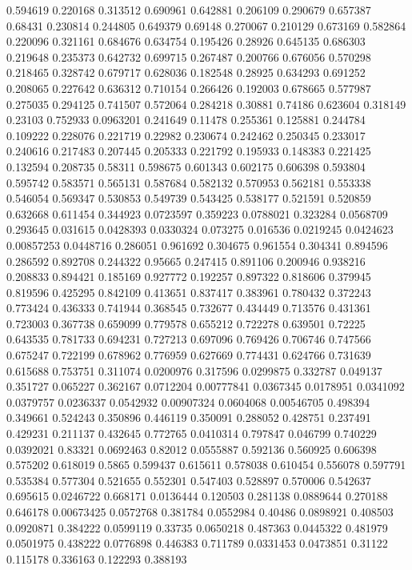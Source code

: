 0.594619 0.220168
0.313512 0.690961
0.642881 0.206109
0.290679 0.657387
0.68431 0.230814
0.244805 0.649379
0.69148 0.270067
0.210129 0.673169
0.582864 0.220096
0.321161 0.684676
0.634754 0.195426
0.28926 0.645135
0.686303 0.219648
0.235373 0.642732
0.699715 0.267487
0.200766 0.676056
0.570298 0.218465
0.328742 0.679717
0.628036 0.182548
0.28925 0.634293
0.691252 0.208065
0.227642 0.636312
0.710154 0.266426
0.192003 0.678665
0.577987 0.275035
0.294125 0.741507
0.572064 0.284218
0.30881 0.74186
0.623604 0.318149
0.23103 0.752933
0.0963201 0.241649
0.11478 0.255361
0.125881 0.244784
0.109222 0.228076
0.221719 0.22982
0.230674 0.242462
0.250345 0.233017
0.240616 0.217483
0.207445 0.205333
0.221792 0.195933
0.148383 0.221425
0.132594 0.208735
0.58311 0.598675
0.601343 0.602175
0.606398 0.593804
0.595742 0.583571
0.565131 0.587684
0.582132 0.570953
0.562181 0.553338
0.546054 0.569347
0.530853 0.549739
0.543425 0.538177
0.521591 0.520859
0.632668 0.611454
0.344923 0.0723597
0.359223 0.0788021
0.323284 0.0568709
0.293645 0.031615
0.0428393 0.0330324
0.073275 0.016536
0.0219245 0.0424623
0.00857253 0.0448716
0.286051 0.961692
0.304675 0.961554
0.304341 0.894596
0.286592 0.892708
0.244322 0.95665
0.247415 0.891106
0.200946 0.938216
0.208833 0.894421
0.185169 0.927772
0.192257 0.897322
0.818606 0.379945
0.819596 0.425295
0.842109 0.413651
0.837417 0.383961
0.780432 0.372243
0.773424 0.436333
0.741944 0.368545
0.732677 0.434449
0.713576 0.431361
0.723003 0.367738
0.659099 0.779578
0.655212 0.722278
0.639501 0.72225
0.643535 0.781733
0.694231 0.727213
0.697096 0.769426
0.706746 0.747566
0.675247 0.722199
0.678962 0.776959
0.627669 0.774431
0.624766 0.731639
0.615688 0.753751
0.311074 0.0200976
0.317596 0.0299875
0.332787 0.049137
0.351727 0.065227
0.362167 0.0712204
0.00777841 0.0367345
0.0178951 0.0341092
0.0379757 0.0236337
0.0542932 0.00907324
0.0604068 0.00546705
0.498394 0.349661
0.524243 0.350896
0.446119 0.350091
0.288052 0.428751
0.237491 0.429231
0.211137 0.432645
0.772765 0.0410314
0.797847 0.046799
0.740229 0.0392021
0.83321 0.0692463
0.82012 0.0555887
0.592136 0.560925
0.606398 0.575202
0.618019 0.5865
0.599437 0.615611
0.578038 0.610454
0.556078 0.597791
0.535384 0.577304
0.521655 0.552301
0.547403 0.528897
0.570006 0.542637
0.695615 0.0246722
0.668171 0.0136444
0.120503 0.281138
0.0889644 0.270188
0.646178 0.00673425
0.0572768 0.381784
0.0552984 0.40486
0.0898921 0.408503
0.0920871 0.384222
0.0599119 0.33735
0.0650218 0.487363
0.0445322 0.481979
0.0501975 0.438222
0.0776898 0.446383
0.711789 0.0331453
0.0473851 0.31122
0.115178 0.336163
0.122293 0.388193
